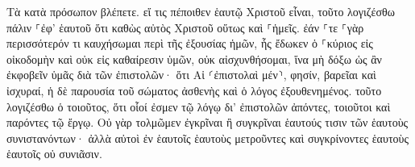 \documentclass{openreader}
\begin{document}
Τὰ κατὰ πρόσωπον βλέπετε. εἴ τις πέποιθεν ἑαυτῷ Χριστοῦ εἶναι, τοῦτο λογιζέσθω πάλιν ⸀ἐφ’ ἑαυτοῦ ὅτι καθὼς αὐτὸς Χριστοῦ οὕτως καὶ ⸀ἡμεῖς. 
ἐάν ⸀τε ⸀γὰρ περισσότερόν τι καυχήσωμαι περὶ τῆς ἐξουσίας ἡμῶν, ἧς ἔδωκεν ὁ ⸀κύριος εἰς οἰκοδομὴν καὶ οὐκ εἰς καθαίρεσιν ὑμῶν, οὐκ αἰσχυνθήσομαι, 
ἵνα μὴ δόξω ὡς ἂν ἐκφοβεῖν ὑμᾶς διὰ τῶν ἐπιστολῶν· 
ὅτι Αἱ ⸂ἐπιστολαὶ μέν⸃, φησίν, βαρεῖαι καὶ ἰσχυραί, ἡ δὲ παρουσία τοῦ σώματος ἀσθενὴς καὶ ὁ λόγος ἐξουθενημένος. 
τοῦτο λογιζέσθω ὁ τοιοῦτος, ὅτι οἷοί ἐσμεν τῷ λόγῳ δι’ ἐπιστολῶν ἀπόντες, τοιοῦτοι καὶ παρόντες τῷ ἔργῳ. 
Οὐ γὰρ τολμῶμεν ἐγκρῖναι ἢ συγκρῖναι ἑαυτούς τισιν τῶν ἑαυτοὺς συνιστανόντων· ἀλλὰ αὐτοὶ ἐν ἑαυτοῖς ἑαυτοὺς μετροῦντες καὶ συγκρίνοντες ἑαυτοὺς ἑαυτοῖς οὐ συνιᾶσιν. 
\end{document}

